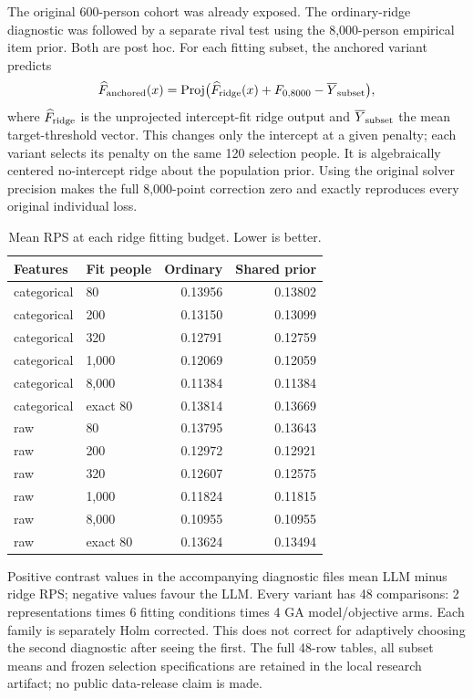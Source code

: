 \documentclass[sigconf,anonymous]{aamas}
\begin{document}
The original 600-person cohort was already exposed. The ordinary-ridge diagnostic
was followed by a separate rival test using the 8,000-person empirical item prior.
Both are post hoc. For each fitting subset, the anchored variant predicts
\begin{equation}
\widehat F_{\rm anchored}(x)=\operatorname{Proj}\bigl(\widehat F_{\rm ridge}(x)+F_{0,8000}-\overline Y_{\rm subset}\bigr),
\end{equation}
where $\widehat F_{\rm ridge}$ is the unprojected intercept-fit ridge output and
$\overline Y_{\rm subset}$ the mean target-threshold vector. This changes only the
intercept at a given penalty; each variant selects its penalty on the same 120
selection people. It is algebraically centered no-intercept ridge about the
population prior. Using the original solver precision makes the full 8,000-point
correction zero and exactly reproduces every original individual loss.

\begin{table}[H]\centering\small
\caption{Mean RPS at each ridge fitting budget. Lower is better.}\label{tab:budget}
\begin{tabular}{@{}llrr@{}}\toprule
Features & Fit people & Ordinary & Shared prior\\\midrule
categorical & 80 & 0.13956 & 0.13802\\
categorical & 200 & 0.13150 & 0.13099\\
categorical & 320 & 0.12791 & 0.12759\\
categorical & 1,000 & 0.12069 & 0.12059\\
categorical & 8,000 & 0.11384 & 0.11384\\
categorical & exact 80 & 0.13814 & 0.13669\\
raw & 80 & 0.13795 & 0.13643\\
raw & 200 & 0.12972 & 0.12921\\
raw & 320 & 0.12607 & 0.12575\\
raw & 1,000 & 0.11824 & 0.11815\\
raw & 8,000 & 0.10955 & 0.10955\\
raw & exact 80 & 0.13624 & 0.13494\\
\bottomrule\end{tabular}\end{table}

Positive contrast values in the accompanying diagnostic files mean LLM minus
ridge RPS; negative values favour the LLM. Every variant has 48 comparisons:
2 representations times 6 fitting conditions times 4 GA model/objective arms.
Each family is separately Holm corrected. This does not correct for adaptively
choosing the second diagnostic after seeing the first. The full 48-row tables,
all subset means and frozen selection specifications are retained in the local
research artifact; no public data-release claim is made.
\end{document}
